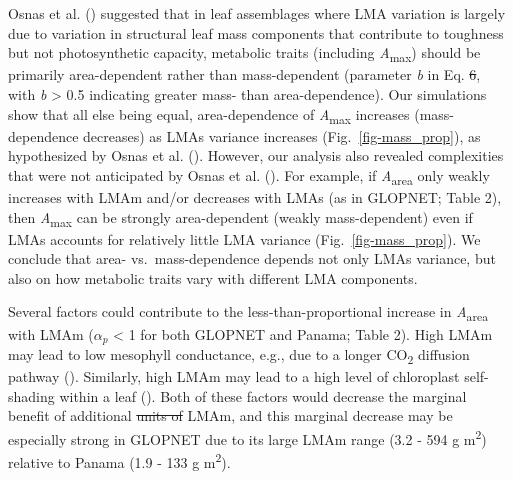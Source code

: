 \documentclass[
  12pt,
  letterpaper,
  DIV=11,
  numbers=noendperiod]{scrartcl}
\providecommand{\DIFadd}[1]{{\protect\color{blue}\uwave{#1}}} %
\providecommand{\DIFdel}[1]{{\protect\color{red}\sout{#1}}}                      %
\providecommand{\DIFaddbegin}{} %
\providecommand{\DIFaddend}{} %
\providecommand{\DIFdelbegin}{} %
\providecommand{\DIFdelend}{} %
\newcommand{\DIFscaledelfig}{0.5}
\newlength{\DIFdelgraphicswidth} %
\newlength{\DIFdelgraphicsheight} %
\newcommand{\DIFaddincludegraphics}[2][]{{\color{blue}\fbox{\DIFOincludegraphics[#1]{#2}}}} %
\newcommand{\DIFdelincludegraphics}[2][]{%
\sbox{\DIFdelgraphicsbox}{\DIFOincludegraphics[#1]{#2}}%
\settoboxwidth{\DIFdelgraphicswidth}{\DIFdelgraphicsbox} %
\settoboxtotalheight{\DIFdelgraphicsheight}{\DIFdelgraphicsbox} %
\scalebox{\DIFscaledelfig}{%
\parbox[b]{\DIFdelgraphicswidth}{\usebox{\DIFdelgraphicsbox}\\[-\baselineskip] \rule{\DIFdelgraphicswidth}{0em}}\llap{\resizebox{\DIFdelgraphicswidth}{\DIFdelgraphicsheight}{%
\setlength{\unitlength}{\DIFdelgraphicswidth}%
\begin{picture}(1,1)%
\thicklines\linethickness{2pt} %
{\color[rgb]{1,0,0}\put(0,0){\framebox(1,1){}}}%
{\color[rgb]{1,0,0}\put(0,0){\line( 1,1){1}}}%
{\color[rgb]{1,0,0}\put(0,1){\line(1,-1){1}}}%
\end{picture}%
}\hspace*{3pt}}} %
} %
\DeclareRobustCommand{\DIFaddbegin}{\DIFOaddbegin \let\includegraphics\DIFaddincludegraphics} %
\DeclareRobustCommand{\DIFaddend}{\DIFOaddend \let\includegraphics\DIFOincludegraphics} %
\DeclareRobustCommand{\DIFdelbegin}{\DIFOdelbegin \let\includegraphics\DIFdelincludegraphics} %
\DeclareRobustCommand{\DIFdelend}{\DIFOaddend \let\includegraphics\DIFOincludegraphics} %
\begin{document}
Osnas et al. () suggested that in leaf
assemblages where LMA variation is largely due to variation in
structural leaf mass components that contribute to toughness but not
photosynthetic capacity, metabolic traits (including
\emph{A}\textsubscript{max}) should be primarily area-dependent rather
than mass-dependent (parameter \emph{b} in Eq. \DIFdelbegin \DIFdel{6}\DIFdelend \DIFaddbegin \DIFadd{S5}\DIFaddend , with \emph{b}
\textgreater{} 0.5 indicating greater mass- than area-dependence). Our
simulations show that all else being equal, area-dependence of
\emph{A}\textsubscript{max} increases (mass-dependence decreases) as
LMAs variance increases (Fig.~\ref{fig-mass_prop}), as hypothesized by
Osnas et al. (). However, our analysis
also revealed complexities that were not anticipated by Osnas et al.
(). For example, if
\emph{A}\textsubscript{area} only weakly increases with LMAm and/or
\DIFaddbegin \emph{\DIFadd{A}}\DIFadd{\textsubscript{area} }\DIFaddend decreases with LMAs (as in GLOPNET; Table
2), then \emph{A}\textsubscript{max} can be strongly area-dependent
(weakly mass-dependent) even if LMAs accounts for relatively little LMA
variance (Fig.~\ref{fig-mass_prop}). We conclude that area-
vs.~mass-dependence depends not only LMAs variance, but also on how
metabolic traits vary with different LMA components.

Several factors could contribute to the less-than-proportional increase
in \emph{A}\textsubscript{area} with LMAm (\(\alpha_p\) \textless{} 1
for both GLOPNET and Panama; Table 2). High LMAm may lead to low
mesophyll conductance, e.g., due to a longer CO\textsubscript{2}
diffusion pathway ().
Similarly, high LMAm may lead to a high level of chloroplast
self-shading within a leaf (). Both of these factors would decrease the marginal benefit
of additional \DIFdelbegin \DIFdel{units of }\DIFdelend LMAm, and this marginal decrease may be especially strong
in GLOPNET due to its large LMAm range (3.2 - 594 g
m\textsuperscript{2}\DIFaddbegin \DIFadd{, according to our model results}\DIFaddend ) relative to Panama
(1.9 - 133 g m\textsuperscript{2}).
\end{document}

